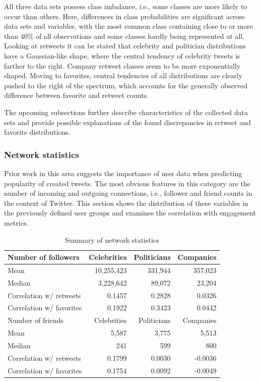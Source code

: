 All three data sets possess class imbalance, i.e., some classes are more likely
to occur than others.
Here, differences in class probabilities are significant across data sets
and variables, with the most common class
containing close to or more than 40\% of all observations and some classes
hardly being represented at all.
Looking at retweets it can be stated that celebrity and politician distributions
have a Gaussian-like shape, where the central tendency of celebrity tweets is
farther to the right.
Company retweet classes seem to be more exponentially shaped.
Moving to favorites, central tendencies of all distributions are clearly pushed to the right of the
spectrum, which accounts for the generally observed difference between favorite
and retweet counts.

The upcoming subsections further describe characteristics of the collected
data sets and provide possible explanations of the found discrepancies in
retweet and favorite distributions.

\subsubsection{Network statistics}
\label{sec:network_stats}

Prior work in this area suggests the importance of user data when predicting
popularity of created tweets.
The most obvious features in this category are the number of incoming and outgoing
connections, i.e., follower and friend counts in the context of Twitter.
This section shows the distribution of these variables in the previously
defined user groups and examines the correlation with engagement metrics.

\begin{table}
\centering
\begin{tabular}{lrrr}
\toprule
Number of followers & Celebrities & Politicians & Companies \\
\midrule
Mean & 10,255,423 & 331,944 & 357,023 \\
Median & 3,228,642 & 89,072 & 23,204 \\
Correlation w/ retweets & 0.1457 & 0.2828 & 0.0326 \\
Correlation w/ favorites & 0.1922 & 0.3423 & 0.0442 \\
\midrule
Number of friends & Celebrities & Politicians & Companies \\
\midrule
Mean & 5,587 & 3,775 & 5,513 \\
Median & 241 & 599 & 800 \\
Correlation w/ retweets & 0.1799 & 0.0030 & -0.0036 \\
Correlation w/ favorites & 0.1754 & 0.0092 & -0.0049 \\
\bottomrule
\end{tabular}
\caption{Summary of network statistics}
\label{tab:network_summary}
\end{table}

